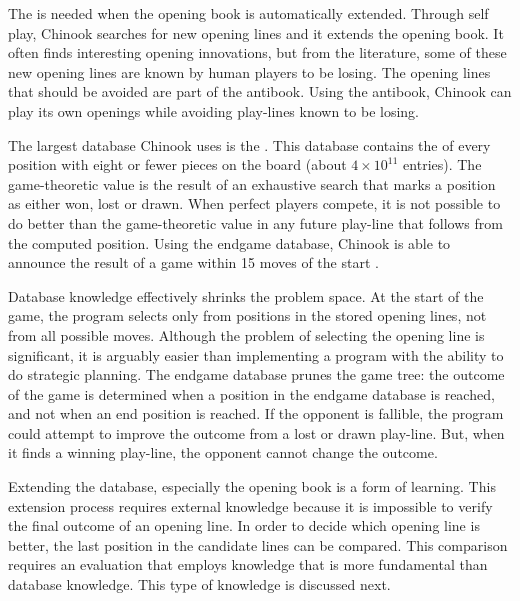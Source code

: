 The  is needed when the opening book is automatically extended.  Through self play, Chinook searches for new opening lines and it extends the opening book.  It often finds interesting opening innovations, but from the  literature, some of these new opening lines are known by human players to be losing. The opening lines that should be avoided are part of the antibook.   Using the antibook, Chinook can play its own openings while avoiding play-lines known to be losing.

The largest database Chinook uses is the .  This database contains the  of every position with eight or fewer pieces on the board (about  $4 \times 10 ^{11}$ entries). The game-theoretic value is the result of an exhaustive search that marks a position as either won, lost or drawn.  When perfect players compete, it is not possible to do better than the game-theoretic value in any future play-line that follows from the computed position.  Using the endgame database, Chinook is able to announce the result of a game within 15 moves of the start \cite{schaeffer:games}.

Database knowledge effectively shrinks the problem space.  At the start of the game, the program selects only from positions in the stored opening lines, not from all possible moves.  Although the problem of selecting the opening line is significant, it is arguably easier than implementing a program with the ability to do strategic planning.  The endgame database prunes the game tree: the outcome of the game is determined when a position in the endgame database is reached, and not when an end position is reached.  If the opponent is fallible, the program could attempt to improve the outcome from a lost or drawn play-line. But, when it finds a winning play-line, the opponent cannot change the outcome.
 
Extending the database, especially the opening book is a form of learning.  This extension process requires external knowledge because it is impossible to verify the final outcome of an opening line.  In order to decide which opening line is better, the last position in the candidate lines can be compared.  This comparison requires an evaluation that employs knowledge that is more fundamental than database knowledge.  This type of knowledge is discussed next.

